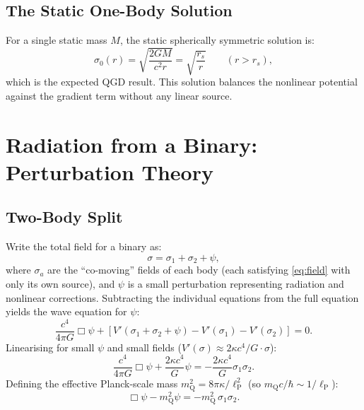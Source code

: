 \documentclass[12pt,a4paper]{article}
\newcommand{\lP}{\ell_{\mathrm{P}}}
\newcommand{\mQ}{m_{\mathrm{Q}}}
\begin{document}
\subsection{The Static One-Body Solution}

For a single static mass $M$, the static spherically symmetric solution is:
\begin{equation}
  \sigma_0(r) = \sqrt{\frac{2GM}{c^2 r}} = \sqrt{\frac{r_s}{r}}
  \qquad (r > r_s),
\end{equation}
which is the expected QGD result. This solution balances the nonlinear
potential against the gradient term without any linear source.

\section{Radiation from a Binary: Perturbation Theory}

\subsection{Two-Body Split}

Write the total field for a binary as:
\begin{equation}
  \sigma = \sigma_1 + \sigma_2 + \psi,
\end{equation}
where $\sigma_a$ are the ``co-moving'' fields of each body (each
satisfying \eqref{eq:field} with only its own source), and $\psi$ is
a small perturbation representing radiation and nonlinear corrections.
Subtracting the individual equations from the full equation yields
the wave equation for $\psi$:
\begin{equation}
  \frac{c^4}{4\pi G}\Box\psi + \left[V'(\sigma_1+\sigma_2+\psi)
    - V'(\sigma_1) - V'(\sigma_2)\right] = 0.
  \label{eq:psi}
\end{equation}
Linearising for small $\psi$ and small fields
($V'(\sigma)\approx 2\kappa c^4/G \cdot \sigma$):
\begin{equation}
  \frac{c^4}{4\pi G}\Box\psi
    + \frac{2\kappa c^4}{G}\psi
    = -\frac{2\kappa c^4}{G}\sigma_1\sigma_2.
\end{equation}
Defining the effective Planck-scale mass $\mQ^2 = 8\pi\kappa/\lP^2$
(so $\mQ c/\hbar \sim 1/\lP$):
\begin{equation}
  \boxed{\Box\psi - \mQ^2\psi = -\mQ^2\,\sigma_1\sigma_2.}
  \label{eq:wave}
\end{equation}
\end{document}
